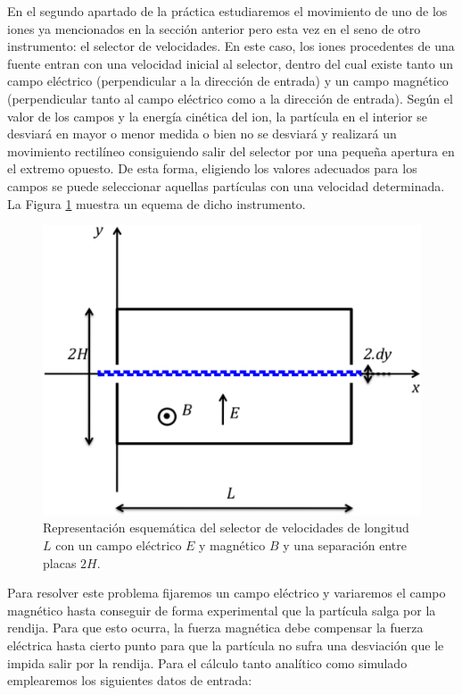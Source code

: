 \documentclass[journal]{IEEEtran}
\begin{document}
En el segundo apartado de la práctica estudiaremos el movimiento de uno de los iones ya mencionados en la sección anterior pero esta vez en el seno de otro instrumento: el selector de velocidades. En este caso, los iones procedentes de una fuente entran con una velocidad inicial al selector, dentro del cual existe tanto un campo eléctrico (perpendicular a la dirección de entrada) y un campo magnético (perpendicular tanto al campo eléctrico como a la dirección de entrada). Según el valor de los campos y la energía cinética del ion, la partícula en el interior se desviará en mayor o menor medida o bien no se desviará y realizará un movimiento rectilíneo consiguiendo salir del selector por una pequeña apertura en el extremo opuesto. De esta forma, eligiendo los valores adecuados para los campos se puede seleccionar aquellas partículas con una velocidad determinada. La Figura \ref{fig:selector} muestra un equema de dicho instrumento.

\begin{figure}[!htb]
    \includegraphics[width=\linewidth]{selector.png}
    \caption{Representación esquemática del selector de velocidades de longitud $L$ con un campo eléctrico $E$ y magnético $B$ y una separación entre placas $2H$.}
    \label{fig:selector}
\end{figure}

Para resolver este problema fijaremos un campo eléctrico y variaremos el campo magnético hasta conseguir de forma experimental que la partícula salga por la rendija. Para que esto ocurra, la fuerza magnética debe compensar la fuerza eléctrica hasta cierto punto para que la partícula no sufra una desviación que le impida salir por la rendija. Para el cálculo tanto analítico como simulado emplearemos los siguientes datos de entrada:
\end{document}
